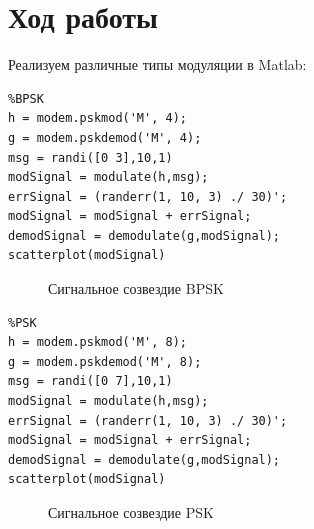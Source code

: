 \documentclass[10pt,a4paper,oneside]{article}
\begin{document}
\section{Ход работы}
Реализуем различные типы модуляции в Matlab:
\begin{verbatim}
%BPSK
h = modem.pskmod('M', 4);
g = modem.pskdemod('M', 4);
msg = randi([0 3],10,1)
modSignal = modulate(h,msg);
errSignal = (randerr(1, 10, 3) ./ 30)';
modSignal = modSignal + errSignal;
demodSignal = demodulate(g,modSignal);
scatterplot(modSignal)
\end{verbatim}

\begin{figure}[h]
	\caption{Сигнальное созвездие BPSK}
\end{figure}
\newpage
\begin{verbatim}
%PSK
h = modem.pskmod('M', 8);
g = modem.pskdemod('M', 8);
msg = randi([0 7],10,1)
modSignal = modulate(h,msg);
errSignal = (randerr(1, 10, 3) ./ 30)';
modSignal = modSignal + errSignal;
demodSignal = demodulate(g,modSignal);
scatterplot(modSignal)
\end{verbatim}

\begin{figure}[h]
	\caption{Сигнальное созвездие PSK}
\end{figure}
\end{document}
